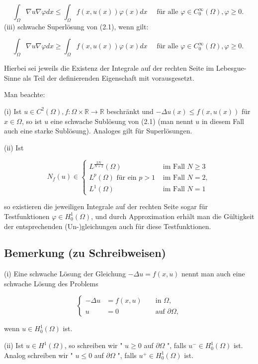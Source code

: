 \documentclass[10pt, letterpaper]{article}
\begin{document}
$$
\int_{\Omega} \nabla u \nabla \varphi d x \leq \int_{\Omega} f(x, u(x)) \varphi(x) d x \quad \text { für alle } \varphi \in C_{0}^{\infty}(\Omega), \varphi \geq 0 \text {. }
$$
(iii) schwache Superlösung von (2.1), wenn gilt:

$$
\int_{\Omega} \nabla u \nabla \varphi d x \geq \int_{\Omega} f(x, u(x)) \varphi(x) d x \quad \text { für alle } \varphi \in C_{0}^{\infty}(\Omega), \varphi \geq 0 \text {. }
$$

Hierbei sei jeweils die Existenz der Integrale auf der rechten Seite im Lebesgue-Sinne als Teil der definierenden Eigenschaft mit vorausgesetzt.

Man beachte:

(i) Ist $u \in C^{2}(\Omega), f: \Omega \times \mathbb{R} \rightarrow \mathbb{R}$ beschränkt und $-\Delta u(x) \leq f(x, u(x))$ für $x \in \Omega$, so ist $u$ eine schwache Sublösung von (2.1) (man nennt $u$ in diesem Fall auch eine starke Sublösung). Analoges gilt für Superlösungen.

(ii) Ist

$$
N_{f}(u) \in \begin{cases}L^{\frac{2 N}{N+2}}(\Omega) & \text { im Fall } N \geq 3 \\ L^{p}(\Omega) \text { für ein } p>1 & \text { im Fall } N=2, \\ L^{1}(\Omega) & \text { im Fall } N=1\end{cases}
$$

so existieren die jeweiligen Integrale auf der rechten Seite sogar für Testfunktionen $\varphi \in H_{0}^{1}(\Omega)$, und durch Approximation erhält man die Gültigkeit der entsprechenden (Un-)gleichungen auch für diese Testfunktionen.

\subsection*{Bemerkung (zu Schreibweisen)}

(i) Eine schwache Lösung der Gleichung $-\Delta u=f(x, u)$ nennt man auch eine schwache Lösung des Problems

$$
\left\{\begin{aligned}
-\Delta u & =f(x, u) & & \text { in } \Omega, \\
u & =0 & & \text { auf } \partial \Omega,
\end{aligned}\right.
$$

wenn $u \in H_{0}^{1}(\Omega)$ ist.

(ii) Ist $u \in H^{1}(\Omega)$, so schreiben wir " $u \geq 0$ auf $\partial \Omega$ ", falls $u^{-} \in H_{0}^{1}(\Omega)$ ist. Analog schreiben wir " $u \leq 0$ auf $\partial \Omega$ ", falls $u^{+} \in H_{0}^{1}(\Omega)$ ist.
\end{document}
